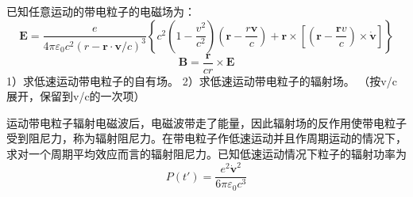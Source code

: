\begin{question}
    已知任意运动的带电粒子的电磁场为：
    $$\mathbf{E}=\frac{e}{4\pi\varepsilon_0 c^2(r-\mathbf{r}\cdot \mathbf{v}/c)^3 }\left \{ c^2(1-\frac{v^2}{c^2})(\mathbf{r}-\frac{r\mathbf{v}}{c})+\mathbf{r} \times\left [ (\mathbf{r}-\frac{\mathbf{r}v}{c})\times \dot{\mathbf{v}} \right ] \right \}$$
    $$\mathbf{B}=\frac{\mathbf{r}}{cr}\times \mathbf{E}$$
    1）求低速运动带电粒子的自有场。
    2）求低速运动带电粒子的辐射场。
    （按v/c展开，保留到v/c的一次项）
\end{question}

\begin{question}
    运动带电粒子辐射电磁波后，电磁波带走了能量，因此辐射场的反作用使带电粒子受到阻尼力，称为辐射阻尼力。在带电粒子作低速运动并且作周期运动的情况下，求对一个周期平均效应而言的辐射阻尼力。已知低速运动情况下粒子的辐射功率为 
    $$P(t')=\frac{e^2 \dot{\mathbf{v}}^2}{6\pi \varepsilon_0 c^3}$$
\end{question}